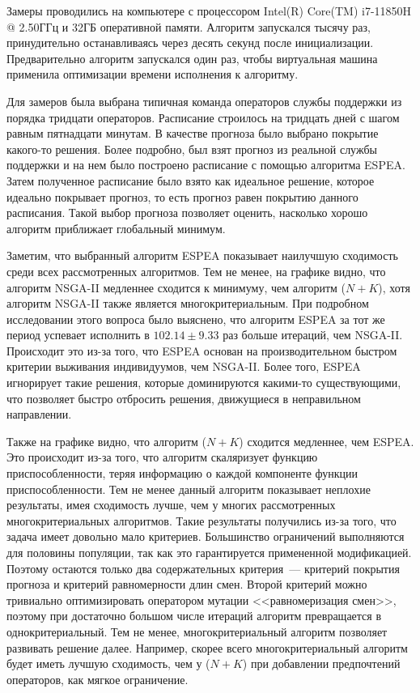\documentclass[times,specification,annotation]{itmo-student-thesis}
\begin{document}
Замеры проводились на компьютере с процессором Intel(R) Core(TM) i7-11850H @ 2.50ГГц и 32ГБ оперативной памяти.
Алгоритм запускался тысячу раз, принудительно останавливаясь через десять секунд после инициализации.
Предварительно алгоритм запускался один раз, чтобы виртуальная машина применила оптимизации времени исполнения к алгоритму.

Для замеров была выбрана типичная команда операторов службы поддержки из порядка тридцати операторов.
Расписание строилось на тридцать дней с шагом равным пятнадцати минутам.
В качестве прогноза было выбрано покрытие какого-то решения.
Более подробно, был взят прогноз из реальной службы поддержки и на нем было построено расписание с помощью алгоритма ESPEA.
Затем полученное расписание было взято как идеальное решение, которое идеально покрывает прогноз, то есть прогноз равен покрытию данного расписания.
Такой выбор прогноза позволяет оценить, насколько хорошо алгоритм приближает глобальный минимум.

Заметим, что выбранный алгоритм ESPEA показывает наилучшую сходимость среди всех рассмотренных алгоритмов.
Тем не менее, на графике видно, что алгоритм NSGA-II медленнее сходится к минимуму, чем алгоритм ($N + K$), хотя алгоритм NSGA-II также является многокритериальным.
При подробном исследовании этого вопроса было выяснено, что алгоритм ESPEA за тот же период успевает исполнить в $102.14 \pm 9.33$ раз больше итераций, чем NSGA-II.
Происходит это из-за того, что ESPEA основан на производительном быстром критерии выживания индивидуумов, чем NSGA-II.
Более того, ESPEA игнорирует такие решения, которые доминируются какими-то существующими, что позволяет быстро отбросить решения, движущиеся в неправильном направлении.

Также на графике видно, что алгоритм ($N + K$) сходится медленнее, чем ESPEA.
Это происходит из-за того, что алгоритм скаляризует функцию приспособленности, теряя информацию о каждой компоненте функции приспособленности.
Тем не менее данный алгоритм показывает неплохие результаты, имея сходимость лучше, чем у многих рассмотренных многокритериальных алгоритмов.
Такие результаты получились из-за того, что задача имеет довольно мало критериев.
Большинство ограничений выполняются для половины популяции, так как это гарантируется примененной модификацией.
Поэтому остаются только два содержательных критерия~--- критерий покрытия прогноза и критерий равномерности длин смен.
Второй критерий можно тривиально оптимизировать оператором мутации <<равномеризация смен>>, поэтому при достаточно большом числе итераций алгоритм превращается в однокритериальный.
Тем не менее, многокритериальный алгоритм позволяет развивать решение далее.
Например, скорее всего многокритериальный алгоритм будет иметь лучшую сходимость, чем у ($N + K$) при добавлении предпочтений операторов, как мягкое ограничение.
\end{document}
